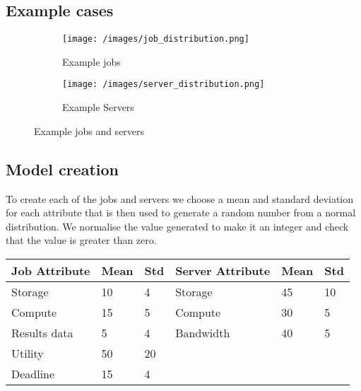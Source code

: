 \subsection{Example cases}\label{subsec:example-cases}
\begin{figure}[H]
    \begin{subfigure}{0.5\textwidth}
        \texttt{[image: /images/job\_distribution.png]}
        \caption{Example jobs}
    \end{subfigure}
    \begin{subfigure}{0.5\textwidth}
        \texttt{[image: /images/server\_distribution.png]}
        \caption{Example Servers}
    \end{subfigure}

    \caption{Example jobs and servers}
\end{figure}

\subsection{Model creation}\label{subsec:model-creation}
To create each of the jobs and servers we choose a mean and standard deviation for each attribute that is then
used to generate a random number from a normal distribution.
We normalise the value generated to make it an integer and check that the value is greater than zero. \\

\begin{tabu} to 1\textwidth { | X[l] | X[l] | X[l] | X[l] | X[l] | X[l] | }
\hline
Job Attribute & Mean & Std & Server Attribute & Mean & Std \\
\hline
Storage & 10 & 4 & Storage & 45 & 10 \\
\hline
Compute & 15 & 5 & Compute & 30 & 5 \\
\hline
Results data & 5 & 4 & Bandwidth & 40 & 5 \\
\hline
Utility & 50 & 20 & & & \\
\hline
Deadline & 15 & 4 & & & \\
\hline
\end{tabu}